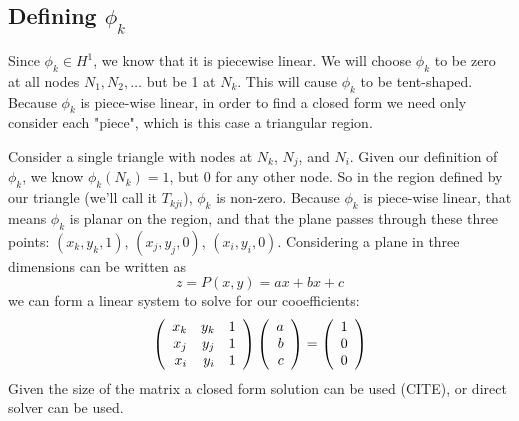 \subsection{Defining $\phi_k$}
Since $\phi_k \in H^1$, we know that it is piecewise linear. We will choose $\phi_k$ to be zero at all nodes
$N_1, N_2, \ldots$ but be 1 at $N_k$. This will cause $\phi_k$ to be tent-shaped. Because $\phi_k$ is piece-wise linear,
in order to find a closed form we need only consider each "piece", which is this case a triangular region.

Consider a single triangle with nodes at $N_k$, $N_j$, and $N_i$. Given our definition of $\phi_k$, we know $\phi_k(N_k) = 1$,
but 0 for any other node. So in the region defined by our triangle (we'll call it $T_{kji}$), $\phi_k$ is non-zero. Because
$\phi_k$ is piece-wise linear, that means $\phi_k$ is planar on the region, and that the plane passes through these three points:
$(x_k, y_k, 1)$, $(x_j, y_j, 0)$, $(x_i, y_i, 0)$. Considering a plane in three dimensions can be written as
\begin{equation} \label{eq:plane}
z = P(x, y) = ax + bx + c
\end{equation}
we can form a linear system to solve for our cooefficients:
\begin{equation} \label{eq:plane_solution}
\left(\begin{array}{rrrr} 
    x_k & y_k & 1 \\
    x_j & y_j & 1 \\
    x_i & y_i & 1
 \\ \end{array} \right)
\left(\begin{array}{rrrr} a \\ b \\ c \\ \end{array} \right)
=
\left(\begin{array}{rrrr} 1 \\ 0 \\ 0 \\ \end{array} \right)
\end{equation}
Given the size of the matrix a closed form solution can be used (CITE), or direct solver can be used.
